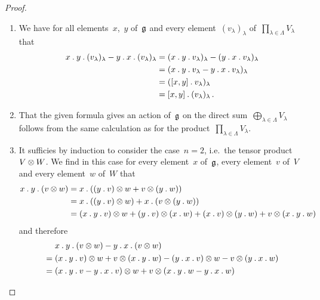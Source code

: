 \begin{proof}
  \leavevmode
  \begin{enumerate}
    \item
      We have for all elements~$x$,~$y$ of~$\mathfrak{g}$ and every element~$(v_\lambda)_\lambda$ of~$\prod_{\lambda \in \Lambda} V_\lambda$ that
      \begin{align*}
        x \mathbin{.} y \mathbin{.} (v_\lambda)_\lambda
        - y \mathbin{.} x \mathbin{.} (v_\lambda)_\lambda
        &=
        (x \mathbin{.} y \mathbin{.} v_\lambda)_\lambda
        - (y \mathbin{.} x \mathbin{.} v_\lambda)_\lambda
        \\
        &=
        (x \mathbin{.} y \mathbin{.} v_\lambda - y \mathbin{.} x \mathbin{.} v_\lambda)_\lambda
        \\
        &=
        ([x,y] \mathbin{.} v_\lambda)_\lambda
        \\
        &=
        [x,y] \mathbin{.} (v_\lambda)_\lambda \,.
      \end{align*}
    \item
      That the given formula gives an action of~$\mathfrak{g}$ on the direct sum~$\bigoplus_{\lambda \in \Lambda} V_\lambda$ follows from the same calculation as for the product~$\prod_{\lambda \in \Lambda} V_\lambda$.
    \item
      It sufficies by induction to consider the case~$n = 2$, i.e.\ the tensor product~$V \otimes W$.
      We find in this case for every element~$x$ of~$\mathfrak{g}$, every element~$v$ of~$V$ and every element~$w$ of~$W$ that
      \begin{align*}
        x \mathbin{.} y \mathbin{.} (v \otimes w)
        &=
        x \mathbin{.} ( (y \mathbin{.} v) \otimes w
        + v \otimes (y \mathbin{.} w) )
        \\
        &=
        x \mathbin{.} ( (y \mathbin{.} v) \otimes w)
        + x \mathbin{.} (v \otimes (y \mathbin{.} w) )
        \\
        &=
        (x \mathbin{.} y \mathbin{.} v) \otimes w
        + (y \mathbin{.} v) \otimes (x \mathbin{.} w)
        + (x \mathbin{.} v) \otimes (y \mathbin{.} w)
        + v \otimes (x \mathbin{.} y \mathbin{.} w)
      \end{align*}
      and therefore
      \begin{align*}
        {}&
        x \act y \act (v \tensor w)
        - y \act x \act (v \tensor w)
        \\
        ={}&
        (x \act y \act v) \tensor w
        + v \tensor (x \act y \act w)
        - (y \act x \act v) \tensor w
        - v \tensor (y \act x \act w)
        \\
        ={}&
        (x \act y \act v - y \act x \act v) \tensor w
        + v \tensor (x \act y \act w - y \act x \act w)

\end{align*}
\end{enumerate}
\end{proof}
